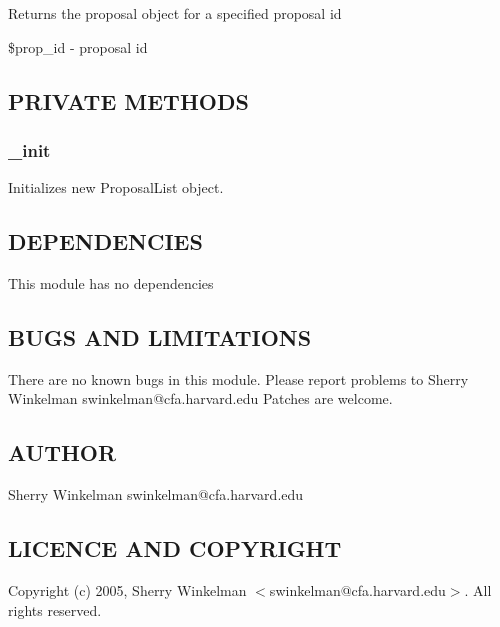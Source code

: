 \documentclass{article}
\begin{document}
Returns the proposal object for a specified proposal id

\begin{description}

\item[{\$prop\_id - proposal id}] \mbox{}\end{description}
\subsection*{PRIVATE METHODS\label{ProposalList_PRIVATE_METHODS}}
\subsubsection*{\_init\label{ProposalList__init}}


Initializes new ProposalList object.

\subsection*{DEPENDENCIES\label{ProposalList_DEPENDENCIES}}


This module has no dependencies

\subsection*{BUGS AND LIMITATIONS\label{ProposalList_BUGS_AND_LIMITATIONS}}


There are no known bugs in this module.
Please report problems to Sherry Winkelman swinkelman@cfa.harvard.edu
Patches are welcome.

\subsection*{AUTHOR\label{ProposalList_AUTHOR}}


Sherry Winkelman swinkelman@cfa.harvard.edu

\subsection*{LICENCE AND COPYRIGHT\label{ProposalList_LICENCE_AND_COPYRIGHT}}


Copyright (c) 2005, Sherry Winkelman $<$swinkelman@cfa.harvard.edu$>$. All rights 
reserved.
\end{document}
